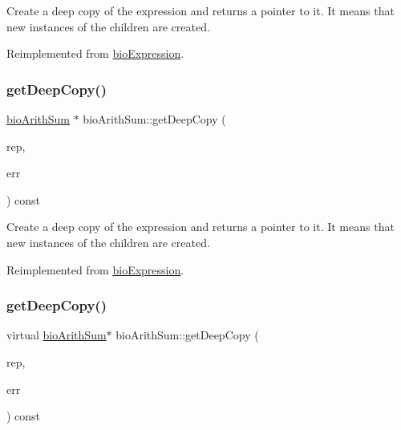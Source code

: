 Create a deep copy of the expression and returns a pointer to it. It means that new instances of the children are created. 

Reimplemented from \hyperlink{classbio_expression_a4ee1b8add634078a02eaae26cd40dcc8}{bio\+Expression}.

\mbox{\label{classbio_arith_sum_ad32aa07569ab7c8f118a632f331e55d7}} 
\subsubsection{\texorpdfstring{get\+Deep\+Copy()}{getDeepCopy()}\hspace{0.1cm}{\footnotesize\ttfamily [2/4]}}
{\footnotesize\ttfamily \hyperlink{classbio_arith_sum}{bio\+Arith\+Sum} $\ast$ bio\+Arith\+Sum\+::get\+Deep\+Copy (\begin{DoxyParamCaption}\item[{\hyperlink{classbio_expression_repository}{bio\+Expression\+Repository} $\ast$}]{rep,  }\item[{pat\+Error $\ast$\&}]{err }\end{DoxyParamCaption}) const\hspace{0.3cm}{\ttfamily [virtual]}}

Create a deep copy of the expression and returns a pointer to it. It means that new instances of the children are created. 

Reimplemented from \hyperlink{classbio_expression_a4ee1b8add634078a02eaae26cd40dcc8}{bio\+Expression}.

\mbox{\label{classbio_arith_sum_ab3264f5810c52c59b96ae72370e441ff}} 
\subsubsection{\texorpdfstring{get\+Deep\+Copy()}{getDeepCopy()}\hspace{0.1cm}{\footnotesize\ttfamily [3/4]}}
{\footnotesize\ttfamily virtual \hyperlink{classbio_arith_sum}{bio\+Arith\+Sum}$\ast$ bio\+Arith\+Sum\+::get\+Deep\+Copy (\begin{DoxyParamCaption}\item[{\hyperlink{classbio_expression_repository}{bio\+Expression\+Repository} $\ast$}]{rep,  }\item[{pat\+Error $\ast$\&}]{err }\end{DoxyParamCaption}) const\hspace{0.3cm}{\ttfamily [virtual]}}

